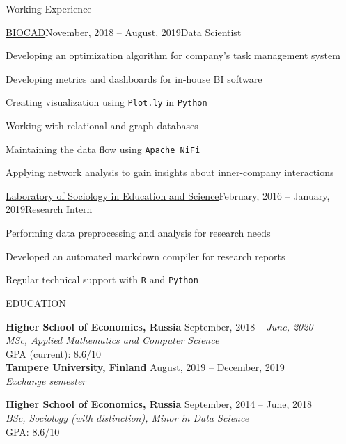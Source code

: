 \documentclass[]{resume} %
\begin{document}
\begin{rSection}{Working Experience}
    
    \begin{rSubsection}{\href{https://biocadglobal.com/about_us.html}{BIOCAD}}{November, 2018 -- August, 2019}{Data Scientist}{}
        \item Developing an optimization algorithm for company's task management system
        \item Developing metrics and dashboards for in-house BI software
        \item Creating visualization using \texttt{Plot.ly} in \texttt{Python}
    \item Working with relational and graph databases
    \item Maintaining the data flow using \texttt{Apache NiFi}
    \item Applying network analysis to gain insights about inner-company interactions
  \end{rSubsection}

  \begin{rSubsection}{\href{https://slon.hse.ru/en/}{Laboratory of Sociology in Education and Science}}{February, 2016 -- January, 2019}{Research Intern}{}
        \item Performing data preprocessing and analysis for research needs
        \item Developed an automated markdown compiler for research reports
    \item Regular technical support with \texttt{R} and \texttt{Python}\\[-4.3ex]
  \end{rSubsection}

\end{rSection}

\begin{rSection}{EDUCATION}

{\bf Higher School of Economics, Russia} \hfill September, 2018 -- \textit{June, 2020} \\ 
\textit{MSc, Applied Mathematics and Computer Science} \\
GPA (current): 8.6/10\\[-3ex]

{\bf Tampere University, Finland} \hfill August, 2019 -- December, 2019 \\ 
\textit{Exchange semester}

{\bf Higher School of Economics, Russia} \hfill September, 2014 -- June, 2018 \\ 
\textit{BSc, Sociology (with distinction), Minor in Data Science} \\
GPA: 8.6/10\\[-3.3ex]

\end{rSection}
\end{document}
